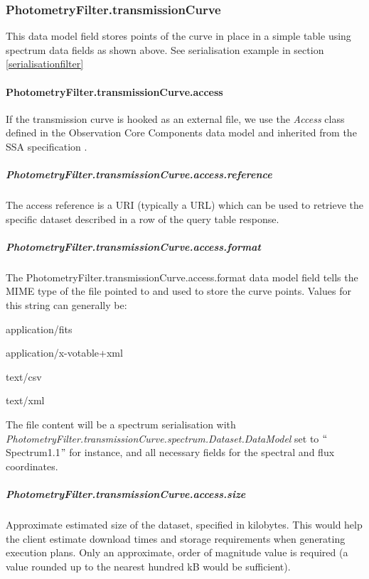 \documentclass[11pt,a4paper]{ivoa}
\begin{document}
\subsubsection{PhotometryFilter.transmissionCurve}
This data model field stores points of the curve in place in a simple table using spectrum 
data fields as shown above. See serialisation example in section 
\ref{serialisationfilter} \par

\paragraph{PhotometryFilter.transmissionCurve.access}
If the transmission curve is hooked as an external file, we use the \textit{Access} class 
defined in the Observation Core Components data model \citep{2017ivoa.spec.0509L} and inherited 
from the SSA specification \citep{2012ivoa.spec.0210T}.
\par

\subparagraph{PhotometryFilter.transmissionCurve.access.reference} 

The access reference is a URI (typically a URL) which can be used to retrieve the 
specific dataset described in a row of the query table response. \par

\subparagraph{PhotometryFilter.transmissionCurve.access.format}
The PhotometryFilter.transmissionCurve.access.format data model field tells the MIME 
type of the file pointed to and used to store the curve points. Values for this 
string can generally be:\par

application/fits \par
application/x-votable+xml \par
text/csv \par
text/xml
\bigskip



The file content will be a spectrum serialisation with 
\textit{PhotometryFilter.transmissionCurve.spectrum.Dataset.DataModel} set to 
$``$Spectrum1.1$"$  for instance, and all necessary fields for the spectral and 
flux coordinates.
\par

\subparagraph{PhotometryFilter.transmissionCurve.access.size} 
Approximate estimated size of the dataset, specified in kilobytes. This would 
help the client estimate download times and storage requirements when generating 
execution plans. Only an approximate, order of magnitude value is required (a value 
rounded up to the nearest hundred kB would be sufficient).\par
\end{document}
